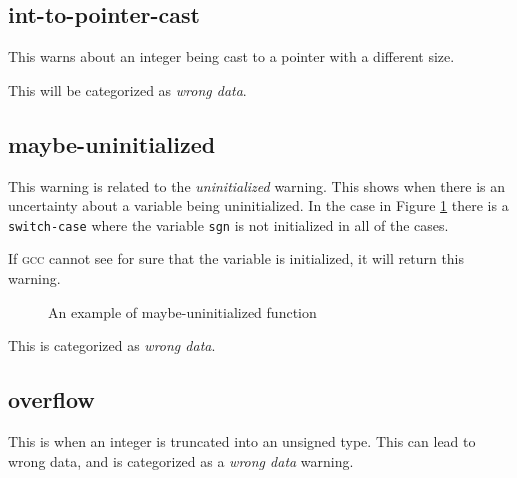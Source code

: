 \documentclass[a4paper,11pt]{report}
\newcommand{\textcode}[1]{\fboxsep=1pt\texttt{\colorbox{gray!20}{#1}}}
\newcommand{\figa}{
    \begin{figure}[!htpb]
    \centering
}
\newcommand{\figb}[2]{
    \caption{#1}
    \label{#2}
    \end{figure}
}
\begin{document}
            \subsection*{int-to-pointer-cast}
This warns about an integer being cast to a pointer with a different size.

This will be categorized as \emph{wrong data}.


            %


            \subsection*{maybe-uninitialized}
This warning is related to the \emph{uninitialized} warning. This shows when 
there is an uncertainty about a variable being uninitialized. In the 
case in Figure \ref{lst:maybeuninitializedreal} there is a \texttt{switch-case} 
where the variable \textcode{sgn} is not initialized in all of the cases.

If \textsc{gcc} cannot see for sure that the variable is initialized, it will 
return this warning.

\figa
    \subfigure{
        
    }
\figb{An example of maybe-uninitialized function}{lst:maybeuninitializedreal}

This is categorized as \emph{wrong data}.


            \subsection*{overflow}
This is when an integer is truncated into an unsigned type. This can lead to 
wrong data, and is categorized as a \emph{wrong data} warning.
\end{document}
